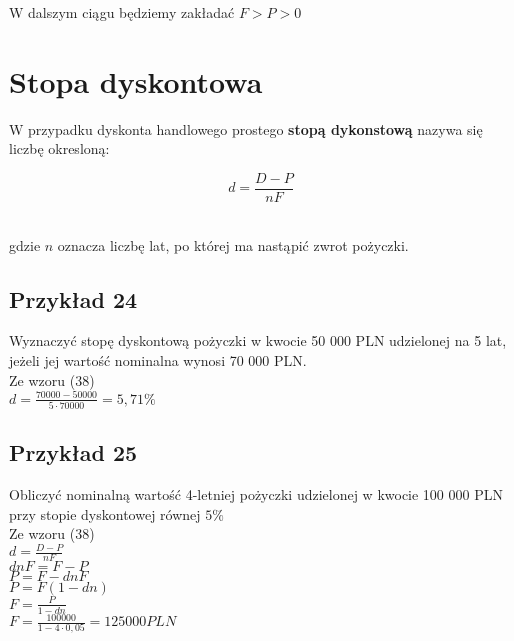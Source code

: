 \documentclass{article}
\begin{document}
W dalszym ciągu będziemy zakładać $ F > P > 0 $ 

\newpage

%
%

\section{Stopa dyskontowa}
W przypadku dyskonta handlowego prostego \textbf{stopą dykonstową} nazywa się liczbę okresloną:

\begin{center}
	\begin{equation}
		d = \frac{D - P}{nF}
	\end{equation}
\end{center}\\

gdzie $ n $ oznacza liczbę lat, po której ma nastąpić zwrot pożyczki.

\subsection{Przykład 24}
Wyznaczyć stopę dyskontową pożyczki w kwocie 50 000 PLN udzielonej na 5 lat, jeżeli jej wartość nominalna wynosi 70 000 PLN.\\

Ze wzoru (38)\\

$ d = \frac{70 000 - 50 000}{5 \cdot 70 000} = 5,71\% $

\subsection{Przykład 25}
Obliczyć nominalną wartość 4-letniej pożyczki udzielonej w kwocie 100 000 PLN przy stopie dyskontowej równej $ 5\% $\\

Ze wzoru (38)\\

$ d = \frac{D - P}{nF} $\\

$ dnF = F - P $\\

$ P = F - dnF $\\

$ P = F(1 - dn) $\\

$ F = \frac{P}{1 - dn} $\\

$ F = \frac{100 000}{1 - 4 \cdot 0,05} = 125 000 PLN $
\end{document}
